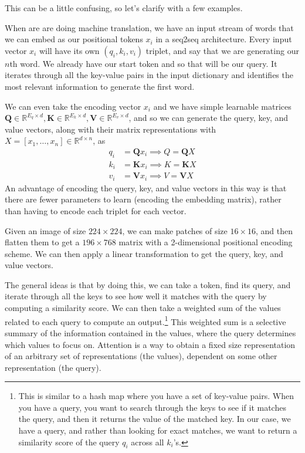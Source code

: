 \documentclass{article}
\begin{document}
    This can be a little confusing, so let's clarify with a few examples. 

    \begin{example}
      When are are doing machine translation, we have an input stream of words that we can embed as our positional tokens $x_i$ in a seq2seq architecture. Every input vector $x_i$ will have its own $(q_i, k_i, v_i)$ triplet, and say that we are generating our $n$th word. We already have our start token and so that will be our query. It iterates through all the key-value pairs in the input dictionary and identifies the most relevant information to generate the first word. 

      We can even take the encoding vector $x_i$ and we have simple learnable matrices $\mathbf{Q} \in \mathbb{R}^{E_q \times d}, \mathbf{K} \in \mathbb{R}^{E_k \times d}, \mathbf{V} \in \mathbb{R}^{E_v \times d}$, and so we can generate the query, key, and value vectors, along with their matrix representations with $X = [x_1, \ldots, x_n] \in \mathbb{R}^{d \times n}$, as 
      \begin{align*} 
        q_i & = \mathbf{Q} x_i \implies Q = \mathbf{Q} X \\
        k_i & = \mathbf{K} x_i \implies K = \mathbf{K} X \\
        v_i & = \mathbf{V} x_i \implies V = \mathbf{V} X 
      \end{align*}
      An advantage of encoding the query, key, and value vectors in this way is that there are fewer parameters to learn (encoding the embedding matrix), rather than having to encode each triplet for each vector.
    \end{example}

    \begin{example}[Images]
      Given an image of size $224 \times 224$, we can make patches of size $16 \times 16$, and then flatten them to get a $196 \times 768$ matrix with a 2-dimensional positional encoding scheme. We can then apply a linear transformation to get the query, key, and value vectors.
    \end{example}

    The general ideas is that by doing this, we can take a token, find its query, and iterate through all the keys to see how well it matches with the query by computing a similarity score. We can then take a weighted sum of the values related to each query to compute an output.\footnote{This is similar to a hash map where you have a set of key-value pairs. When you have a query, you want to search through the keys to see if it matches the query, and then it returns the value of the matched key. In our case, we have a query, and rather than looking for exact matches, we want to return a similarity score of the query $q_i$ across all $k_i$'s.} This weighted sum is a selective summary of the information contained in the values, where the query determines which values to focus on. Attention is a way to obtain a fixed size representation of an arbitrary set of representations (the values), dependent on some other representation (the query). 
\end{document}
